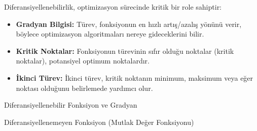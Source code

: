 \begin{tcolorbox}[title=Diferansiyellenebilirlik ve Optimizasyon Arasındaki İlişki]
Diferansiyellenebilirlik, optimizasyon sürecinde kritik bir role sahiptir:
\begin{itemize}
    \item \textbf{Gradyan Bilgisi:} Türev, fonksiyonun en hızlı artış/azalış yönünü verir, böylece optimizasyon algoritmaları nereye gideceklerini bilir.
    \item \textbf{Kritik Noktalar:} Fonksiyonun türevinin sıfır olduğu noktalar (kritik noktalar), potansiyel optimum noktalardır.
    \item \textbf{İkinci Türev:} İkinci türev, kritik noktanın minimum, maksimum veya eğer noktası olduğunu belirlemede yardımcı olur.
\end{itemize}
\end{tcolorbox}

\begin{marginfigure}
    \centering
    \caption{Diferansiyellenebilir Fonksiyon ve Gradyan}
    \label{fig:differentiability}
\end{marginfigure}

\begin{marginfigure}
    \centering
    \caption{Diferansiyellenemeyen Fonksiyon (Mutlak Değer Fonksiyonu)}
    \label{fig:non_differentiable}
\end{marginfigure}

